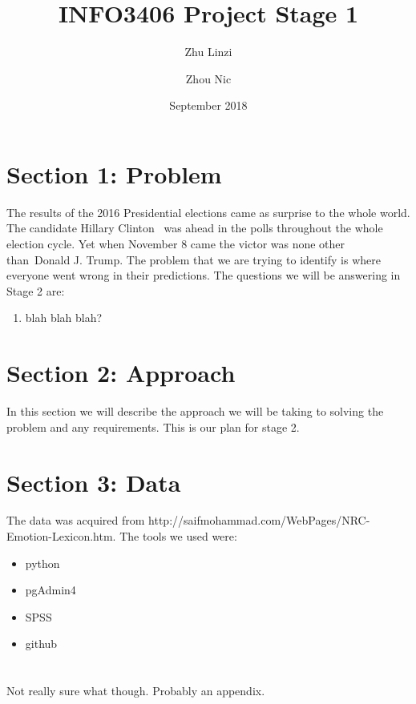 \documentclass[12pt,a4paper]{article}
\begin{document}
\begin{titlepage}
    \title{INFO3406 Project Stage 1}
    \author{Zhu Linzi\\
            \and
            Zhou Nic
    }
    \date{September 2018}
    \maketitle
\end{titlepage}

    \pagebreak
    \tableofcontents
    \pagebreak

    \section{Section 1: Problem}
    The results of the 2016 Presidential elections came as surprise to the whole world. The candidate Hillary Clinton \
    was ahead in the polls throughout the whole election cycle. Yet when November 8 came the victor was none other than\
    Donald J. Trump. The problem that we are trying to identify is where everyone went wrong in their predictions.
    \newline \newline
    The questions we will be answering in Stage 2 are:

    \begin{enumerate}
        \item blah blah blah?
    \end{enumerate}

    \section{Section 2: Approach}
    In this section we will describe the approach we will be taking to solving the problem and any requirements. This is our plan for stage 2.

    \section{Section 3: Data}

    The data was acquired from http://saifmohammad.com/WebPages/NRC-Emotion-Lexicon.htm.
    \newline \newline
    The tools we used were:

    \begin{itemize}
        \item python
        \item pgAdmin4
        \item SPSS
        \item github
    \end{itemize}
    \appendix
    \section{}
    Not really sure what though. Probably an appendix.
\end{document}
